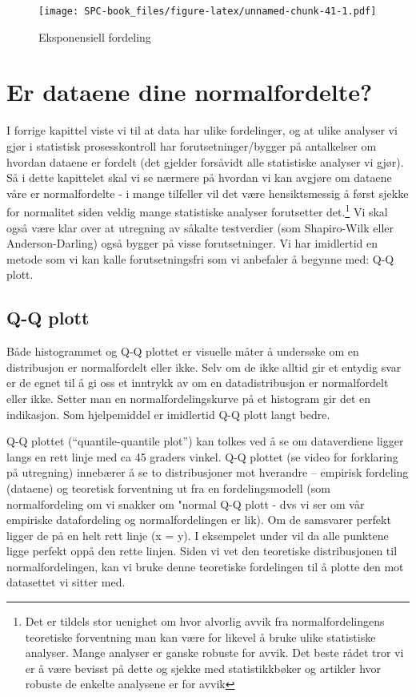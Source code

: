 \documentclass[
]{book}
\begin{document}
\begin{figure}
\centering
\texttt{[image: SPC-book\_files/figure-latex/unnamed-chunk-41-1.pdf]}
\caption{\label{fig:unnamed-chunk-41}Eksponensiell fordeling}
\end{figure}

\hypertarget{er-dataene-dine-normalfordelte}{%
\chapter{Er dataene dine normalfordelte?}\label{er-dataene-dine-normalfordelte}}

I forrige kapittel viste vi til at data har ulike fordelinger, og at ulike analyser vi gjør i statistisk prosesskontroll har forutsetninger/bygger på antalkelser om hvordan dataene er fordelt (det gjelder forsåvidt alle statistiske analyser vi gjør). Så i dette kapittelet skal vi se nærmere på hvordan vi kan avgjøre om dataene våre er normalfordelte - i mange tilfeller vil det være hensiktsmessig å først sjekke for normalitet siden veldig mange statistiske analyser forutsetter det.\footnote{Det er tildels stor uenighet om hvor alvorlig avvik fra normalfordelingens teoretiske forventning man kan være for likevel å bruke ulike statistiske analyser. Mange analyser er ganske robuste for avvik. Det beste rådet tror vi er å være bevisst på dette og sjekke med statistikkbøker og artikler hvor robuste de enkelte analysene er for avvik} Vi skal også være klar over at utregning av såkalte testverdier (som Shapiro-Wilk eller Anderson-Darling) også bygger på visse forutsetninger. Vi har imidlertid en metode som vi kan kalle forutsetningsfri som vi anbefaler å begynne med: Q-Q plott.

\hypertarget{q-q-plott}{%
\section{Q-Q plott}\label{q-q-plott}}

Både histogrammet og Q-Q plottet er visuelle måter å undersøke om en distribusjon er normalfordelt eller ikke. Selv om de ikke alltid gir et entydig svar er de egnet til å gi oss et inntrykk av om en datadistribusjon er normalfordelt eller ikke. Setter man en normalfordelingskurve på et histogram gir det en indikasjon. Som hjelpemiddel er imidlertid Q-Q plott langt bedre.

Q-Q plottet (``quantile-quantile plot'') kan tolkes ved å se om dataverdiene ligger langs en rett linje med ca 45 graders vinkel. Q-Q plottet (se video for forklaring på utregning) innebærer å se to distribusjoner mot hverandre -- empirisk fordeling (dataene) og teoretisk forventning ut fra en fordelingsmodell (som normalfordeling om vi snakker om "normal Q-Q plott - dvs vi ser om vår empiriske datafordeling og normalfordelingen er lik). Om de samsvarer perfekt ligger de på en helt rett linje (x = y). I eksempelet under vil da alle punktene ligge perfekt oppå den rette linjen. Siden vi vet den teoretiske distribusjonen til normalfordelingen, kan vi bruke denne teoretiske fordelingen til å plotte den mot datasettet vi sitter med.
\end{document}
